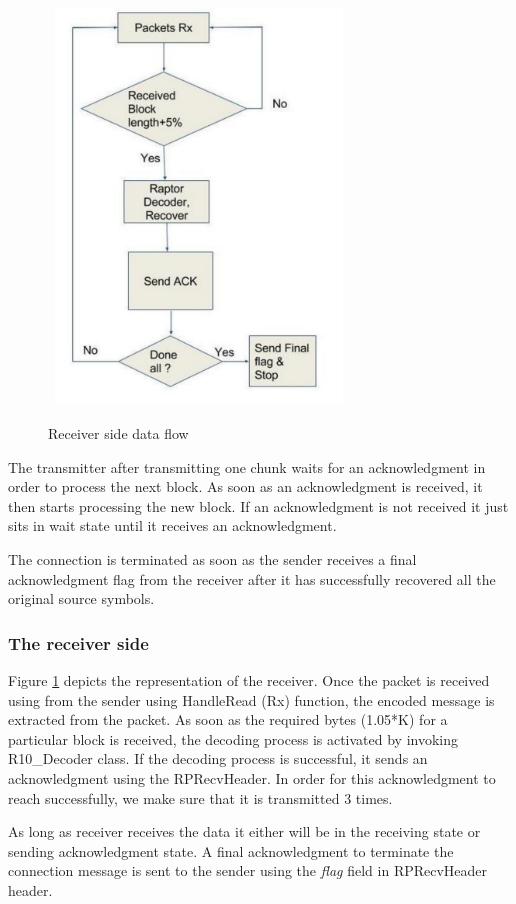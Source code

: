 \begin{figure}[!t]
\begin{center}
\mbox{
\includegraphics[width=3.0in]{Figures/rp_recv}}
\caption{Receiver side data flow}
\label{recv_flow}
\end{center}
\end{figure}

The transmitter after transmitting one chunk waits for an acknowledgment in order to process the next block. As soon as an acknowledgment is received, it then starts processing the new block. If an acknowledgment is not received it just sits in wait state until it receives an acknowledgment. 

The connection is terminated as soon as the sender receives a final acknowledgment flag from the receiver after it has successfully recovered all the original source symbols.

\subsubsection{The receiver side}
Figure \ref{recv_flow} depicts the representation of the receiver. Once the packet is received using from the sender using HandleRead (Rx) function, the encoded message is extracted from the packet. As soon as the required bytes (1.05*K) for a particular block is received, the decoding process is activated by invoking R10\_Decoder class. If the decoding process is successful, it sends an acknowledgment using the RPRecvHeader. In order for this acknowledgment to reach successfully, we make sure that it is transmitted 3 times.

As long as receiver receives the data it either will be in the receiving state or sending acknowledgment state. A final acknowledgment to terminate the connection message is sent to the sender using the \textit{flag} field in RPRecvHeader header.



               